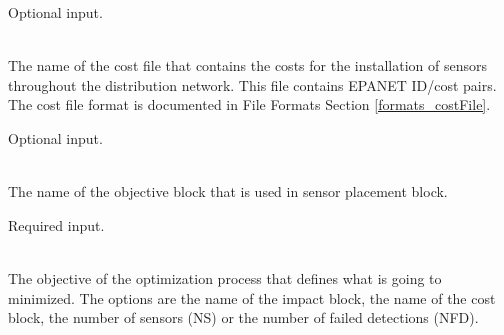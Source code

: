 \begin{description}[topsep=0pt,parsep=0.5em,itemsep=-0.4em]
\begin{description}[topsep=0pt,parsep=0.5em,itemsep=-0.4em]
                Optional input.
    \item[{cost file}]\hfill
\\The name of the cost file that contains the costs for the installation of
                sensors throughout the distribution network. This file contains
                EPANET ID/cost pairs.
                The cost file format is documented in File Formats Section \ref{formats_costFile}.
                
                Optional input.
  \end{description}
  \item[{objective}]\hfill
  \begin{description}[topsep=0pt,parsep=0.5em,itemsep=-0.4em]
    \item[{name}]\hfill
\\The name of the objective block that is used in sensor placement block.
                
                Required input.
    \item[{goal}]\hfill
\\The objective of the optimization process that defines what is going to minimized. 
                The options are the name of the impact block, the name of the cost block, 
                the number of sensors (NS) or the number of failed detections (NFD).
				

\end{description}
\end{description}
